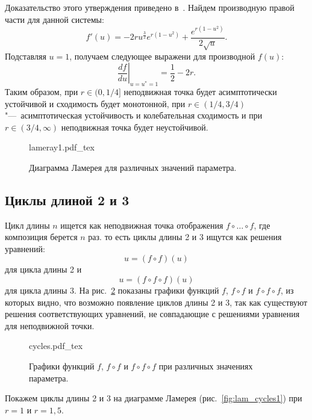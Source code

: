 \documentclass[12pt, a4paper]{article} %
\newcommand{\incfig}[1]{%
    \def\svgwidth{\columnwidth}
    {#1.pdf_tex}
}
\begin{document}
Доказательство этого утверждения приведено в~\cite[с.~83]{Bratus}.
Найдем производную правой части для данной системы:
 \begin{equation}
     f'(u) = - 2 r u^{\frac{3}{2}} e^{r \left(1 - u^{2}\right)} + \frac{e^{r \left(1 - u^{2}\right)}}{2 \sqrt{u}}
.\end{equation} 
Подставляя $u = 1$, получаем следующее выражени для производной  $f(u)$:
 \begin{equation}
     \left. \frac{df}{du} \right|_{u=u^*=1} = \frac{1}{2} - 2r
.\end{equation} 
Таким образом, при $r \in (0, 1\!/\!4]$ неподвижная точка будет асимптотически устойчивой и сходимость будет монотонной,
при $r \in (1\!/\!4, 3/\!4)$"---~асимптотическая устойчивость и колебательная сходимость и 
при $r \in (3 /\!4, \infty)$ неподвижная точка будет неустойчивой.

\begin{figure}[ht]
    \centering
    \incfig{lameray1}
    \caption{Диаграмма Ламерея для различных значений параметра.}
    \label{fig:lameray1}
\end{figure}

\subsection{Циклы длиной 2 и 3}

Цикл длины $n$ ищется как неподвижная точка отображения  $f\circ \ldots \circ f$, где композиция берется $n$ раз.
то есть циклы длины 2 и 3 ищутся как решения уравнений:
\begin{equation}
    u = (f\circ f)(u)
\end{equation} 
для цикла длины 2 и
\begin{equation}
    u = (f \circ f \circ f)(u)
\end{equation}
для цикла длины 3.
На рис.~\ref{fig:cycles} показаны графики функций $f$,  $f \circ f$ и
$f \circ f \circ f$, из которых видно, что возможно появление циклов длины 2 и 3,
так как существуют решения соответствующих уравнений, не совпадающие с решениями уравнения для неподвижной точки.
\begin{figure}[ht]
    \centering
    \incfig{cycles}
    \caption{Графики функций $f$,  $f \circ f$ и $f \circ f \circ f$ при различных значениях параметра.}
    \label{fig:cycles}
\end{figure}

Покажем циклы длины 2 и 3 на диаграмме Ламерея (рис.~\ref{fig:lam_cycles1}) при $r=1$ и  $r=1{,}5$.
\end{document}
